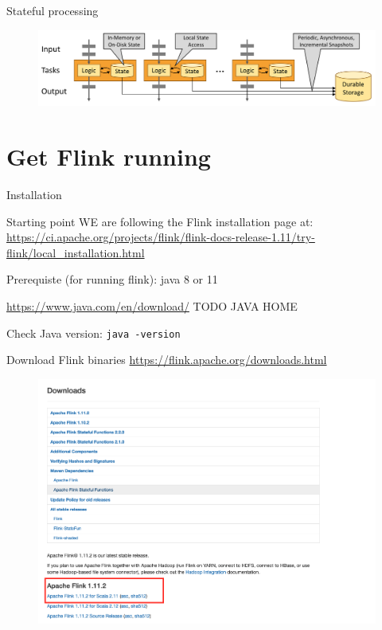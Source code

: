 \documentclass[blue]{beamer}
\begin{document}
\begin{frame}{Stateful processing}
    \begin{figure}
        \centering
        \includegraphics[width=\textwidth]{local-state.png}
        \label{fig:streamexample}
    \end{figure}
\end{frame}
\section{Get Flink running}
\begin{frame}{Installation}
\begin{block}{Starting point}
WE are following the Flink installation page at:
\url{https://ci.apache.org/projects/flink/flink-docs-release-1.11/try-flink/local_installation.html}

\end{block}
\begin{block}{Prerequiste  (for running flink):}
 java 8 or 11
 
 \url{https://www.java.com/en/download/}
 TODO JAVA HOME

Check Java version:
{\tt java -version}

\end{block}
\end{frame}
\begin{frame}{Download Flink binaries}
\url{https://flink.apache.org/downloads.html}
\begin{figure}
        \centering
        \includegraphics[width=\textwidth]{Flink_download_page.png}
        \label{fig:streamexample}
    \end{figure}

\end{frame}
\end{document}
